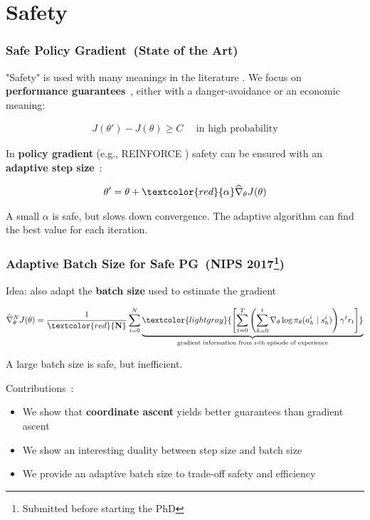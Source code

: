 \documentclass{beamer}
\begin{document}
\section{Safety}


\begin{frame}
\frametitle{Safe Policy Gradient~\small(State of the Art)}
"Safety" is used with many meanings in the literature \cite{garcia2015comprehensive}. We focus on \textbf{performance guarantees}~\cite{kakade2002approximately, thomas2015high}, either with a danger-avoidance or an economic meaning:

\begin{align*}
	J(\theta') - J(\theta) \geq C \quad\text{ in high probability}
\end{align*}

In \textbf{policy gradient} (e.g., REINFORCE \cite{williams1992simple}) safety can be ensured with an \textbf{adaptive step size}~\cite{pirotta2013adaptive}:

\begin{align*}
	\theta' = \theta + \textcolor{red}{\mathbf{\alpha}}\widehat{\nabla}_{\theta}J(\theta)
\end{align*}

A small $\alpha$ is safe, but slows down convergence. The adaptive algorithm can find the best value for each iteration. 

\end{frame}


\begin{frame}
\frametitle{Adaptive Batch Size for Safe PG~\small(NIPS 2017\footnote{Submitted before starting the PhD})}
Idea: also adapt the \textbf{batch size} used to estimate the gradient

\begin{align*}
	\widehat{\nabla}_{\theta}^NJ(\theta) = \frac{1}{\textcolor{red}{\mathbf{N}}}\sum_{i=0}^{N}\underbrace{\textcolor{lightgray}{\left[\sum_{t=0}^T\left(\sum_{h=0}^t\nabla_{\theta}\log\pi_{\theta}(a_h^i\mid s_h^i)\right) \gamma^tr_t\right]}}_{\text{gradient information from $i$-th episode of experience}}
\end{align*}

A large batch size is safe, but inefficient.

\vfill

Contributions~\cite{papini2017adaptive}:
\begin{itemize}
	\item We show that \textbf{coordinate ascent} yields better guarantees than gradient ascent
	\item We show an interesting duality between step size and batch size
	\item We provide an adaptive batch size to trade-off safety and efficiency
\end{itemize}

\end{frame}
\end{document}
